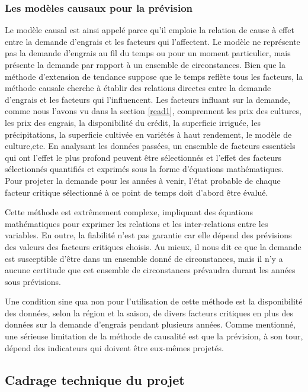 	\subsubsection{Les modèles causaux pour la prévision}
	Le modèle causal est ainsi appelé parce qu'il emploie la relation de cause à effet entre la demande d'engrais et les facteurs qui l'affectent. Le modèle ne représente pas la demande d'engrais au fil du temps ou pour un moment particulier, mais présente la demande par rapport à un ensemble de circonstances. Bien que la méthode d'extension de tendance suppose que le temps reflète tous les facteurs, la méthode causale cherche à établir des relations directes entre la demande d'engrais et les facteurs qui l'influencent. Les facteurs influant sur la demande, comme nous l'avons vu dans la section \ref{read1}, comprennent les prix des cultures, les prix des engrais, la disponibilité du crédit, la superficie irriguée, les précipitations, la superficie cultivée en variétés à haut rendement, le modèle de culture,etc. En analysant les données passées, un ensemble de facteurs essentiels qui ont l'effet le plus profond peuvent être sélectionnés et l'effet des facteurs sélectionnés quantifiés et exprimés sous la forme d'équations mathématiques. Pour projeter la demande pour les années à venir, l'état probable de chaque facteur critique sélectionné à ce point de temps doit d'abord être évalué.
	
	Cette méthode est extrêmement complexe, impliquant des équations mathématiques pour exprimer les relations et les inter-relations entre les variables. En outre, la fiabilité n'est pas garantie car elle dépend des prévisions des valeurs des facteurs critiques choisis. Au mieux, il nous dit ce que la demande est susceptible d'être dans un ensemble donné de circonstances, mais il n'y a aucune certitude que cet ensemble de circonstances prévaudra durant les années sous prévisions.
	
	Une condition sine qua non pour l'utilisation de cette méthode est la disponibilité des données, selon la région et la saison, de divers facteurs critiques en plus des données sur la demande d'engrais pendant plusieurs années. Comme mentionné, une sérieuse limitation de la méthode de causalité est que la prévision, à son tour, dépend des indicateurs qui doivent être eux-mêmes projetés.
	\subsection{Cadrage technique du projet}
